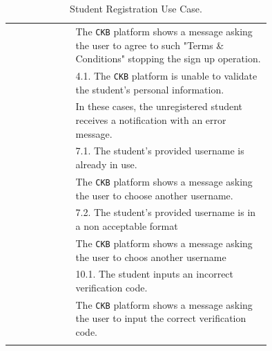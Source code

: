 \begin{center}
\begin{longtable}{lp{0.75\linewidth}}
            & The \verb|CKB| platform shows a message asking the user to agree to such "Terms \& Conditions" stopping the sign up operation.  \\                                                                                                   
        & 4.1. The \verb|CKB| platform is unable to validate the student's personal information.  \\                                                                                                         
            & In these cases, the unregistered student receives a notification with an error message.   \\
        & 7.1. The student's provided username is already in use.           \\                                                                                                
            & The \verb|CKB| platform shows a message asking the user to choose another username.   \\
        & 7.2. The student's provided username is in a non acceptable format    \\
            & The \verb|CKB| platform shows a message asking the user to choos another username    \\
        & 10.1. The student inputs an incorrect verification code.      \\                                                           
            & The \verb|CKB| platform shows a message asking the user to input the correct verification code.  \\
                                                                                        
        \hline
        \caption{Student Registration Use Case.}
        \label{tab: student_registration_use_case}
    \end{longtable}

\end{center}

